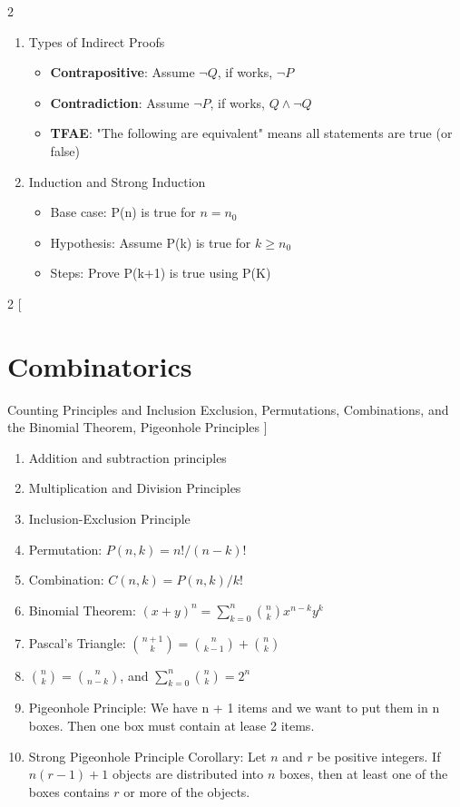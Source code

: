 \documentclass[]{article}
\begin{document}
\begin{multicols}{2}
\begin{enumerate}
  \item Types of Indirect Proofs
    \begin{itemize}
        \item \textbf{Contrapositive}: Assume $\neg Q$, if works, $\neg P$
        \item \textbf{Contradiction}: Assume $\neg P$, if works, $Q \land \neg Q$
        \item \textbf{TFAE}: "The following are equivalent" means all statements are true (or false)
    \end{itemize}
  \item Induction and Strong Induction
    \begin{itemize}
      \item Base case: P(n) is true for $n = n_0$ 
      \item Hypothesis: Assume P(k) is true for $k \geq n_0$
      \item Steps: Prove P(k+1) is true using P(K)
    \end{itemize}
  
\end{enumerate}

\end{multicols}

\begin{multicols}{2}
[
\section{Combinatorics}
Counting Principles and Inclusion Exclusion, Permutations, Combinations, and the Binomial Theorem, Pigeonhole Principles
]

\begin{enumerate}
    \item Addition and subtraction principles
    \item Multiplication and Division Principles
    \item Inclusion-Exclusion Principle
    \item Permutation: $P(n, k)=n!/(n - k)!$
    \item Combination: $C(n, k) = P(n, k)/k!$
    \item Binomial Theorem: $(x+y)^n=\sum^{n}_{k=0}{\binom{n}{k}x^{n-k}y^k}$
    \item Pascal's Triangle: $\binom{n + 1}{k} = \binom{n}{k - 1} + \binom{n}{k}$
    \item $\binom{n}{k} = \binom{n}{n - k}$, and $\sum^n_{k = 0}{\binom{n}{k}} = 2^n$
    \item Pigeonhole Principle: We have n + 1 items and we want to put them in n boxes. Then one box must contain at lease 2 items.
    \item Strong Pigeonhole Principle Corollary: Let $n$ and $r$ be positive integers. If $n(r - 1) + 1$ objects are distributed into $n$ boxes, then at least one of the boxes contains $r$ or more of the objects.

\end{enumerate}

\end{multicols}
\end{document}

